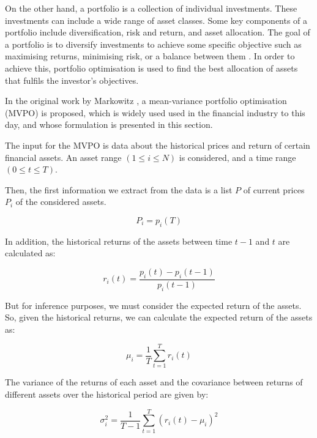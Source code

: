 \documentclass[prx,twocolumn,floatfix,superscriptaddress,longbibliography]{revtex4-1}
\begin{document}
On the other hand, a portfolio is a collection of individual investments. These investments can include a wide range of asset classes. Some key components of a portfolio include diversification, risk and return, and asset allocation. The goal of a portfolio is to diversify investments to achieve some specific objective such as maximising returns, minimising risk, or a balance between them \cite{Wilmott2007}. 
In order to achieve this, portfolio optimisation is used to find the best allocation of assets that fulfils the investor's objectives.

In the original work by Markowitz \cite{Markowitz1952}, a mean-variance portfolio optimisation (MVPO) is proposed, which is widely 
used used in the financial industry to this day, and whose formulation is presented in this section.

The input for the MVPO is data about the historical prices and return of certain financial assets. An asset range $(1 \leq i \leq N)$ is considered, and a time range $(0 \leq t \leq T)$. 

Then, the first information we extract from the data is a list $P$ of current prices $P_i$  of the considered assets.

\begin{equation}
  \label{eq:1}
  P_i = p_i(T)
\end{equation}

In addition, the historical returns of the assets between time $t-1$ and $t$ are calculated as:

\begin{equation}
  \label{eq:2}
  r_i(t) = \frac{p_i(t) - p_i(t-1)}{p_i(t-1)}
\end{equation}

But for inference purposes, we must consider the expected return of the assets. So, given the historical returns, we can calculate the expected return of the assets as:

\begin{equation}
  \label{eq:3}
  \mu_i = \frac{1}{T} \sum_{t=1}^{T} r_i(t)
\end{equation}

The variance of the returns of each asset and the covariance between returns of different assets over the historical period are given by:

\begin{equation}
  \label{eq:4}
  \sigma_i^2 = \frac{1}{T-1} \sum_{t=1}^{T} (r_i(t) - \mu_i)^2
\end{equation}
\end{document}
